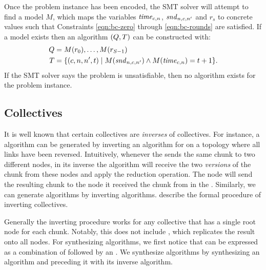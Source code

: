 Once the problem instance has been encoded, the SMT solver will
attempt to find a model $M$, which maps the variables $\mathit{time}_{c,n}$,
$\mathit{snd}_{n,c,n'}$ and $r_s$ to concrete values such that Constraints
\ref{eqn:bc-zero} through \ref{eqn:bc-rounds} are satisfied. If a
model exists then an algorithm $(Q, T)$ can be constructed
with:
\begin{align*}
    Q&=M(r_0),\dotsc,M(r_{S-1}) \\
    T&=\{(c,n,n',t) \;|\; M(\mathit{snd}_{n,c,n'}) \wedge M(\mathit{time}_{c,n}) = t+1 \}.
\end{align*}
If the SMT solver says the problem is unsatisfiable, then no algorithm
exists for the problem instance.


\subsection{\reducingCap Collectives}
\label{sec:reduction}
It is well known that certain \reducing collectives are {\em inverses}
of \broadcasting collectives. For instance, a \reduce algorithm can be
generated by inverting an algorithm for \broadcast on a topology where
all links have been reversed. Intuitively, whenever the \broadcast
sends the same chunk to two different nodes, in its inverse the
\reduce algorithm will receive the two {\em versions} of the chunk
from these nodes and apply the reduction operation. The node will send
the resulting chunk to the node it received the chunk from in the
\broadcast. Similarly, we can generate \reducescatter algorithms by
inverting \allgather algorithms. %
describe the formal procedure of inverting \broadcasting collectives.

Generally the inverting procedure works for any \reducing collective
that has a single root node for each chunk. Notably, this does not
include \allreduce, which replicates the result onto all nodes. For
synthesizing \allreduce algorithms, we first notice that \allreduce
can be expressed as a combination of \reducescatter followed by an
\allgather. We synthesize \allreduce algorithms by synthesizing an
\allgather algorithm and preceding it with its inverse \reducescatter
algorithm.

